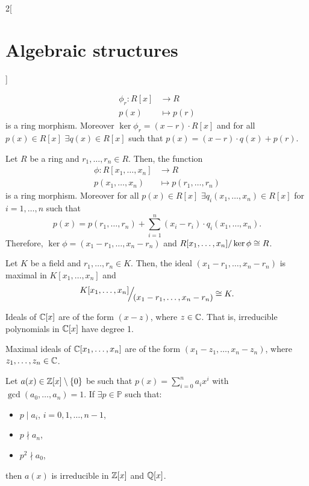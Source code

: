 \documentclass[../../../main.tex]{subfiles}
\begin{document}
\begin{multicols}{2}[\section{Algebraic structures}]
\begin{corollary}
\begin{align*}
        \phi_r:R[x]&\longrightarrow R\\
        p(x)&\longmapsto p(r)        
    \end{align*}
    is a ring morphism. Moreover $\ker\phi_r=(x-r)\cdot R[x]$ and for all $p(x)\in R[x]$ $\exists q(x)\in R[x]$ such that $p(x)=(x-r)\cdot q(x)+p(r)$.
\end{corollary}
\begin{corollary}
    Let $R$ be a ring and $r_1,\ldots,r_n\in R$. Then, the function 
    \begin{align*}
        \phi:R[x_1,\ldots,x_n]&\longrightarrow R\\
        p(x_1,\ldots,x_n)&\longmapsto p(r_1,\ldots,r_n)        
    \end{align*}
    is a ring morphism. Moreover for all $p(x)\in R[x]$ $\exists q_i(x_1,\ldots,x_n)\in R[x]$ for $i=1,\ldots,n$ such that $$p(x)=p(r_1,\ldots,r_n)+\sum_{i=1}^n(x_i-r_i)\cdot q_i(x_1,\ldots,x_n).$$ Therefore, $\ker\phi=(x_1-r_1,\ldots,x_n-r_n)$ and $\quot{R[x_1,\ldots,x_n]}{\ker\phi}\cong R$.
\end{corollary}
\begin{corollary}
    Let $K$ be a field and $r_1,\ldots,r_n\in K$. Then, the ideal $(x_1-r_1,\ldots,x_n-r_n)$ is maximal in $K[x_1,\ldots,x_n]$ and $$\quot{K[x_1,\ldots,x_n]}{(x_1-r_1,\ldots,x_n-r_n)}\cong K.$$
\end{corollary}
\begin{theorem}
    Ideals of $\mathbb{C}[x]$ are of the form $(x-z)$, where $z\in\mathbb{C}$. That is, irreducible polynomials in $\mathbb{C}[x]$ have degree 1.
\end{theorem}
\begin{theorem}
    Maximal ideals of $\mathbb{C}[x_1,\ldots,x_n]$ are of the form $(x_1-z_1,\ldots,x_n-z_n)$, where $z_1,\ldots,z_n\in\mathbb{C}$.
\end{theorem}
\begin{theorem}
    Let $a(x)\in\mathbb{Z}[x]\setminus\{0\}$ be such that $p(x)=\sum_{i=0}^na_ix^i$ with $\gcd(a_0,\ldots,a_n)=1$. If $\exists p\in\mathbb{P}$ such that:
    \begin{itemize}
        \item $p\mid a_i$, $i=0,1,\ldots,n-1$,
        \item $p\nmid a_n$,
        \item $p^2\nmid a_0$,
    \end{itemize}
    then $a(x)$ is irreducible in $\mathbb{Z}[x]$ and $\mathbb{Q}[x]$.
\end{theorem}




\end{multicols}
\end{document}
